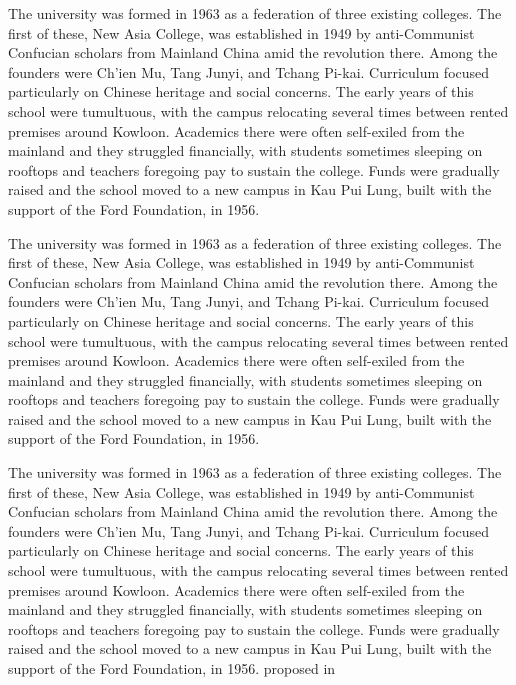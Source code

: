 The university was formed in 1963 as a federation of three existing colleges. The first of these, New Asia College, was established in 1949 by anti-Communist Confucian scholars from Mainland China amid the revolution there. Among the founders were Ch'ien Mu, Tang Junyi, and Tchang Pi-kai. Curriculum focused particularly on Chinese heritage and social concerns. The early years of this school were tumultuous, with the campus relocating several times between rented premises around Kowloon. Academics there were often self-exiled from the mainland and they struggled financially, with students sometimes sleeping on rooftops and teachers foregoing pay to sustain the college. Funds were gradually raised and the school moved to a new campus in Kau Pui Lung, built with the support of the Ford Foundation, in 1956.

The university was formed in 1963 as a federation of three existing colleges. The first of these, New Asia College, was established in 1949 by anti-Communist Confucian scholars from Mainland China amid the revolution there. Among the founders were Ch'ien Mu, Tang Junyi, and Tchang Pi-kai. Curriculum focused particularly on Chinese heritage and social concerns. The early years of this school were tumultuous, with the campus relocating several times between rented premises around Kowloon. Academics there were often self-exiled from the mainland and they struggled financially, with students sometimes sleeping on rooftops and teachers foregoing pay to sustain the college. Funds were gradually raised and the school moved to a new campus in Kau Pui Lung, built with the support of the Ford Foundation, in 1956.

The university was formed in 1963 as a federation of three existing colleges. The first of these, New Asia College, was established in 1949 by anti-Communist Confucian scholars from Mainland China amid the revolution there. Among the founders were Ch'ien Mu, Tang Junyi, and Tchang Pi-kai. Curriculum focused particularly on Chinese heritage and social concerns. The early years of this school were tumultuous, with the campus relocating several times between rented premises around Kowloon. Academics there were often self-exiled from the mainland and they struggled financially, with students sometimes sleeping on rooftops and teachers foregoing pay to sustain the college. Funds were gradually raised and the school moved to a new campus in Kau Pui Lung, built with the support of the Ford Foundation\cite{sadri2011logic}, in 1956\cite{sadri2011logic}.
\cite{sadri2011logic}proposed in \cite{heinze2004modelling}

